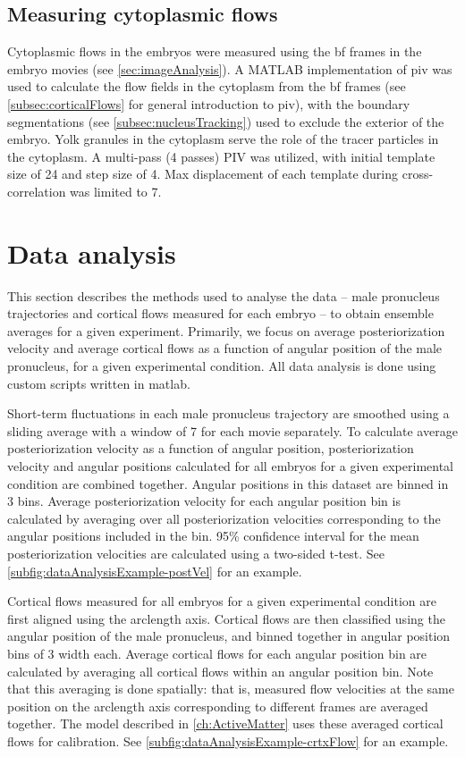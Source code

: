 \subsection{Measuring cytoplasmic flows}\label{subsec:cytoFlows} %
Cytoplasmic flows in the embryos were measured using the \ac{bf} frames in the embryo movies (see \autoref{sec:imageAnalysis}). A MATLAB implementation of \ac{piv} \citep{thielicke2014pivlab} was used to calculate the flow fields in the cytoplasm from the \ac{bf} frames (see \autoref{subsec:corticalFlows} for general introduction to \ac{piv}), with the boundary segmentations (see \autoref{subsec:nucleusTracking}) used to exclude the exterior of the embryo. Yolk granules in the cytoplasm serve the role of the tracer particles in the cytoplasm. A multi-pass (4 passes) PIV was utilized, with initial template size of \SI{24}{\pixels} and step size of \SI{4}{\pixels}. Max displacement of each template during cross-correlation was limited to \SI{7}{\pixels}. 

\section{Data analysis}\label{sec:statAnalysis}
This section describes the methods used to analyse the data -- male pronucleus trajectories and cortical flows measured for each embryo -- to obtain ensemble averages for a given experiment. Primarily, we focus on average posteriorization velocity and average cortical flows as a function of angular position of the male pronucleus, for a given experimental condition. All data analysis is done using custom scripts written in \ac{matlab}.

Short-term fluctuations in each male pronucleus trajectory are smoothed using a sliding average with a window of \SI{7}{\frames} for each movie separately. To calculate average posteriorization velocity as a function of angular position, posteriorization velocity and angular positions calculated for all embryos for a given experimental condition are combined together. Angular positions in this dataset are binned in \SI{3}{\unitAngle} bins. Average posteriorization velocity for each angular position bin is calculated by averaging over all posteriorization velocities corresponding to the angular positions included in the bin. \num{95}\% confidence interval for the mean posteriorization velocities are calculated using a two-sided t-test. See \autoref{subfig:dataAnalysisExample-postVel} for an example.

Cortical flows measured for all embryos for a given experimental condition are first aligned using the arclength axis. Cortical flows are then classified using the angular position of the male pronucleus, and binned together in angular position bins of \SI{3}{\unitAngle} width each. Average cortical flows for each angular position bin are calculated by averaging all cortical flows within an angular position bin. Note that this averaging is done spatially: that is, measured flow velocities at the same position on the arclength axis corresponding to different frames are averaged together. The model described in \autoref{ch:ActiveMatter} uses these averaged cortical flows for calibration. See \autoref{subfig:dataAnalysisExample-crtxFlow} for an example.

